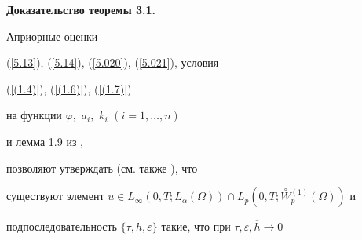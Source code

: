 



{\bf Доказательство теоремы 3.1.}


Априорные оценки


(\ref{5.13}), (\ref{5.14}), (\ref{5.020}), (\ref{5.021}),  условия


(\ref{(1.4)}), (\ref{(1.6)}), (\ref{(1.7)})


на функции $\varphi,$ $a_i,$ $k_i$ $(i=1,\dotsc,n)$


и лемма 1.9 из \cite{Alt},


позволяют утверждать (см. также \cite{N} ), что


существуют  элемент $u \in  L_{\infty }(0,T;


L_{\alpha }(\Omega ) ) \cap  L_{p}( 0,T;


\overset \circ W{}^{(1)}_{p}(\Omega ) ) $ и


подпоследовательность $ \{ \tau, h, \varepsilon \} $  такие, что при $\tau,


\varepsilon, \overline{h} \to 0 $


